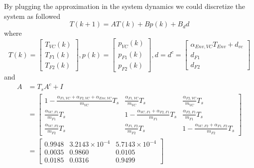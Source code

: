 \documentclass[a4paper,twoside,11pt]{article}
\numberwithin{equation}{section}
\begin{document}
By plugging the approximation in the system dynamics we could discretize the system as followed
\begin{equation}
    T(k+1) = AT(k)+Bp(k)+B_dd
\end{equation}
where 
\begin{equation*}
    T(k) = 
    \begin{bmatrix}
    T_{VC}(k)\\
    T_{F1}(k)\\
    T_{F2}(k)
    \end{bmatrix}
    , 
    p(k) = 
    \begin{bmatrix}
    p_{VC}(k)\\
    p_{F1}(k)\\
    p_{F2}(k)
    \end{bmatrix}
    , 
    d = d^c = 
    \begin{bmatrix}
    \alpha_{Env,VC}T_{Env} + d_{vc}\\
    d_{F1}\\
    d_{F2}
    \end{bmatrix}
\end{equation*}
and
\begin{equation*}
\begin{split}
    A &= 
    T_sA^c + I \\
    &= 
    \begin{bmatrix}
    1-\frac{\alpha_{F1,VC}+\alpha_{F2,VC}+\alpha_{Env,VC}}{m_{VC}}T_s & \frac{\alpha_{F1,VC}}{m_{VC}}T_s & \frac{\alpha_{F2,VC}}{m_{VC}}T_s \\
    \frac{\alpha_{VC,F1}}{m_{F1}}T_s & 1-\frac{\alpha_{VC,F1}+\alpha_{F2,F1}}{m_{F1}}T_s & \frac{\alpha_{F2,F1}}{m_{F1}}T_s \\
    \frac{\alpha_{VC,F2}}{m_{F2}}T_s & \frac{\alpha_{F1,F2}}{m_{F2}}T_s & 1-\frac{\alpha_{VC,F2}+\alpha_{F1,F2}}{m_{F2}}T_s
    \end{bmatrix} \\
    &=
    \begin{bmatrix}
    0.9948 & 3.2143\times10^{-4} & 5.7143\times10^{-4} \\
    0.0035 & 0.9860 & 0.0105 \\
    0.0185 & 0.0316 & 0.9499 
    \end{bmatrix}
\end{split}
\end{equation*}
\end{document}
